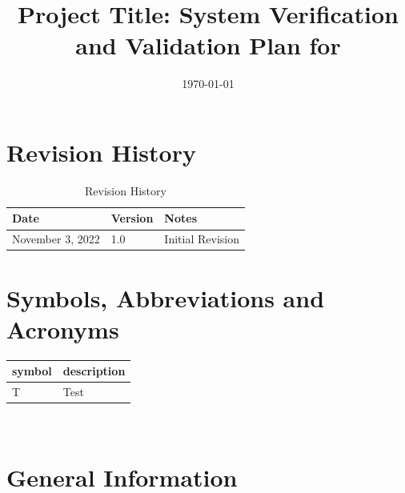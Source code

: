 \documentclass[12pt, titlepage]{article}
\begin{document}
\title{Project Title: System Verification and Validation Plan for \progname{}} 
\author{\authname}
\date{\today}
	
\maketitle


\section{Revision History}

\begin{table}[hp]
\caption{Revision History} \label{TblRevisionHistory}
\begin{tabularx}{\textwidth}{llX}
\toprule
\toprule {\bf Date} & {\bf Version} & {\bf Notes}\\
\midrule
November 3, 2022 & 1.0 & Initial Revision \\
\bottomrule
\end{tabularx}
\end{table}

\newpage

\tableofcontents

\listoftables

\listoffigures

\newpage

\section{Symbols, Abbreviations and Acronyms}

\renewcommand{\arraystretch}{1.2}
\begin{tabular}{l l} 
  \toprule		
  \textbf{symbol} & \textbf{description}\\
  \midrule 
  T & Test\\
  \bottomrule
\end{tabular}\\



\newpage


\section{General Information}
\end{document}
